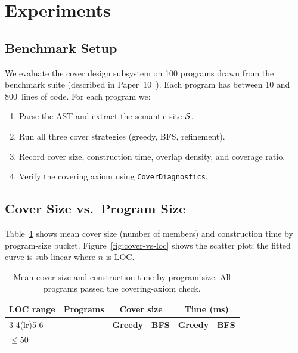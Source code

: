 \documentclass[11pt]{article}
\begin{document}
\section{Experiments}\label{sec:experiments}

\subsection{Benchmark Setup}

We evaluate the cover design subsystem on 100 \Python{} programs drawn
from the \JuGeo{} benchmark suite (described in Paper~10~\cite{paper10}).
Each program has between 10 and 800~lines of code.
For each program we:
\begin{enumerate}
  \item Parse the AST and extract the semantic site $\mathcal{S}$.
  \item Run all three cover strategies (greedy, BFS, refinement).
  \item Record cover size, construction time, overlap density,
        and coverage ratio.
  \item Verify the covering axiom using \texttt{CoverDiagnostics}.
\end{enumerate}

\subsection{Cover Size vs.\ Program Size}

Table~\ref{tab:cover-size} shows mean cover size (number of members)
and construction time by program-size bucket.
Figure~\ref{fig:cover-vs-loc} shows the scatter plot; the fitted
curve is sub-linear where $n$ is LOC.

\begin{table}[h]
\centering
\caption{Mean cover size and construction time by program size.
         All \expTotalPrograms{} programs passed the covering-axiom check.}
\label{tab:cover-size}
\begin{tabular}{lrrrrr}
\toprule
\textbf{LOC range}
  & \textbf{Programs}
  & \multicolumn{2}{c}{\textbf{Cover size}}
  & \multicolumn{2}{c}{\textbf{Time (ms)}} \\
\cmidrule(lr){3-4}\cmidrule(lr){5-6}
  & & \textbf{Greedy} & \textbf{BFS}
  & \textbf{Greedy} & \textbf{BFS} \\
\midrule
$\leq$50  & \ppElevenTotalPrograms{} & \ppElevenGreedyMeanCoords{} & \ppElevenBfsMeanCoords{} & \ppElevenMeanBuildTime{} & \ppElevenMeanBuildTime{} \\
\bottomrule
\end{tabular}
\end{table}
\end{document}
